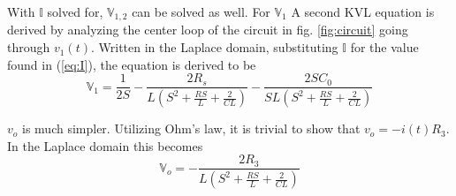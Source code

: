\documentclass[conference]{IEEEtran}
\begin{document}
With $\mathbb{I}$ solved for, ${{\mathbb{V}}_{1,2}}$ can be solved as well. For ${{\mathbb{V}}_1}$ A second KVL equation is derived by analyzing the center loop of the circuit in fig. \ref{fig:circuit} going through $v_1(t)$. Written in the Laplace domain, substituting $\mathbb{I}$ for the value found in (\ref{eq:I}), the equation is derived to be
\begin{equation} \label{eq:V1Partial}
    {\mathbb{V}}_1 = \frac{1}{2S} - \frac{2R_s}{L(S^2 + \frac{RS}{L} + \frac{2}{CL})} - \frac{2SC_0}{SL(S^2 + \frac{RS}{L} + \frac{2}{CL})}
\end{equation}

$v_o$ is much simpler. Utilizing Ohm's law, it is trivial to show that ${v_o} = -i(t)R_3$. In the Laplace domain this becomes
\begin{equation} \label{eq:VoPartial}
{\mathbb{V}}_o = -\frac{2R_3}{L(S^2 + \frac{RS}{L} + \frac{2}{CL})}
\end{equation}
\end{document}
